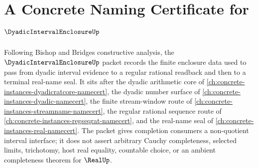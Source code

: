 \chapter{A Concrete Naming Certificate for $\DyadicIntervalEnclosureUp$}
\label{ch:concrete-instances-dyadic-interval-enclosure-namecert}

Following Bishop and Bridges constructive analysis, the $\DyadicIntervalEnclosureUp$ packet records the finite enclosure data used to pass from dyadic interval evidence to a regular rational readback and then to a terminal real-name seal. It sits after the dyadic arithmetic core of \autoref{ch:concrete-instances-dyadicratcore-namecert}, the dyadic number surface of \autoref{ch:concrete-instances-dyadic-namecert}, the finite stream-window route of \autoref{ch:concrete-instances-streamname-namecert}, the regular rational sequence route of \autoref{ch:concrete-instances-regseqrat-namecert}, and the real-name seal of \autoref{ch:concrete-instances-real-namecert}. The packet gives completion consumers a non-quotient interval interface; it does not assert arbitrary Cauchy completeness, selected limits, trichotomy, host real equality, countable choice, or an ambient completeness theorem for $\RealUp$.

